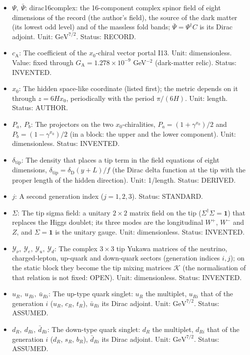 \documentclass[
  10pt,
]{article}
\begin{document}
\begin{itemize}
  \(q_\ell = q_{e_R} = q_{\nu_R} = -1\)), \(q_f\) of the fermion
  component \(f\). Unit: dimensionless. Status: STANDARD.
\item
  \(\Psi,\ \bar\Psi\): dirac16complex: the 16-component complex spinor
  field of eight dimensions of the record (the author's field), the
  source of the dark matter (its lowest odd level) and of the massless
  fold bands; \(\bar\Psi = \Psi^\dagger C\) is its Dirac adjoint. Unit:
  \(\mathrm{GeV}^{7/2}\). Status: RECORD.
\item
  \(c_{\mathrm{A}}\): The coefficient of the \(x_0\)-chiral vector
  portal I13. Unit: dimensionless. Value: fixed through
  \(G_{\mathrm{A}} = 1.278\times10^{-9}\) GeV\(^{-2}\) (dark-matter
  relic). Status: INVENTED.
\item
  \(x_0\): The hidden space-like coordinate (listed first); the metric
  depends on it through \(z = 6Hx_0\), periodically with the period
  \(\pi/(6H)\). Unit: length. Status: AUTHOR.
\item
  \(P_a,\ P_b\): The projectors on the two \(x_0\)-chiralities,
  \(P_a = (1 + \gamma^{x_0})/2\) and \(P_b = (1 - \gamma^{x_0})/2\) (in
  a block: the upper and the lower component). Unit: dimensionless.
  Status: INVENTED.
\item
  \(\delta_{\mathrm{tip}}\): The density that places a tip term in the
  field equations of eight dimensions,
  \(\delta_{\mathrm{tip}} = \delta_{\mathrm{D}}(y + L)/f\) (the Dirac
  delta function at the tip with the proper length of the hidden
  direction). Unit: 1/length. Status: DERIVED.
\item
  \(j\): A second generation index (\(j = 1, 2, 3\)). Status: STANDARD.
\item
  \(\Sigma\): The tip sigma field: a unitary \(2 \times 2\) matrix field
  on the tip (\(\Sigma^\dagger\Sigma = \mathbf{1}\)) that replaces the
  Higgs doublet; its three modes are the longitudinal \(W^+\), \(W^-\)
  and \(Z\), and \(\Sigma = \mathbf{1}\) is the unitary gauge. Unit:
  dimensionless. Status: INVENTED.
\item
  \(\mathcal{Y}_\nu,\ \mathcal{Y}_e,\ \mathcal{Y}_u,\ \mathcal{Y}_d\):
  The complex \(3 \times 3\) tip Yukawa matrices of the neutrino,
  charged-lepton, up-quark and down-quark sectors (generation indices
  \(i, j\)); on the static block they become the tip mixing matrices
  \(\mathcal{K}\) (the normalisation of that relation is not fixed:
  OPEN). Unit: dimensionless. Status: INVENTED.
\item
  \(u_R,\ u_{Ri},\ \bar u_{Ri}\): The up-type quark singlet: \(u_R\) the
  multiplet, \(u_{Ri}\) that of the generation \(i\) (\(u_R\), \(c_R\),
  \(t_R\)), \(\bar u_{Ri}\) its Dirac adjoint. Unit:
  \(\mathrm{GeV}^{7/2}\). Status: ASSUMED.
\item
  \(d_R,\ d_{Ri},\ \bar d_{Ri}\): The down-type quark singlet: \(d_R\)
  the multiplet, \(d_{Ri}\) that of the generation \(i\) (\(d_R\),
  \(s_R\), \(b_R\)), \(\bar d_{Ri}\) its Dirac adjoint. Unit:
  \(\mathrm{GeV}^{7/2}\). Status: ASSUMED.
\end{itemize}
\end{document}
